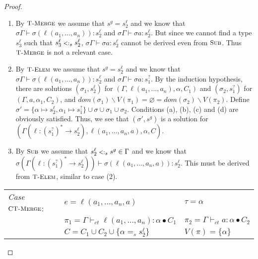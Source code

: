 \documentclass{eptcs}
\newcommand{\ih}{induction hypothesis\xspace}
\newcommand{\CC}{\ensuremath{C}\xspace}
\newcommand{\TElem}{{\small \textsc{T-Elem}}}
\newcommand{\TMerge}{{\small \textsc{T-Merge}}}
\newcommand{\Sub}{{\small \textsc{Sub}}}
\newcommand{\CTMerge}{{\small \textsc{CT-Merge}}}
\newcommand{\sub}{\mathrel{\mbox{{\footnotesize $<:$}}}}
\newcommand{\ctvdash}{\ensuremath{\vdash_{ct}}}
\newcommand{\vsig}[2]{\ensuremath{{#1}^*\rightarrow{#2}}}
\begin{document}
\begin{proof}
\begin{enumerate}
\item By $\TMerge$ we assume that $s^g = s_2^{\ell}$ and we know that
$\sigma\Gamma \vdash \sigma(\ell(a_1,\ldots,a_n)):
s_2^{\ell}$ and $\sigma\Gamma \vdash \sigma a : s_2^{\ell}$. But since we cannot find a
type $s_3^{\ell}$ such that $s_3^{\ell} \sub_s s_2^{\ell}$, $\sigma\Gamma \vdash \sigma a :
s_2^{\ell}$ cannot be derived even from $\Sub$. Thus $\TMerge$ is not a relevant case.

\item By $\TElem$ we assume that $s^g = s_2^{\ell}$ and we know that
$\sigma\Gamma \vdash \sigma(\ell(a_1,\ldots,a_n)):
s_2^{\ell}$ and $\sigma\Gamma \vdash \sigma a : s_1^?$. By the \ih, there are
solutions $(\sigma_1,s_2^{\ell})$ for $(\Gamma, \ell(a_1,\ldots,a_n), \alpha, \CC_1)$
and $(\sigma_2,s_1^?)$ for $(\Gamma,a,\alpha_1,\CC_2)$, and
$dom(\sigma_1) \backslash V(\pi_1) = \varnothing = dom(\sigma_2) \backslash
V(\pi_2)$. Define $\sigma' = \{\alpha \mapsto s_2^{\ell}, \alpha_1 \mapsto s_1^?\}
\cup \sigma \cup \sigma_1 \cup \sigma_2$. Conditions (a), (b), (c) and (d) are obviously satisfied. Thus, we
see that $(\sigma',s^g)$ is a solution for $(\Gamma(\ell :
\vsig{(s_1^?)}{s_2^{\ell}}), \ell(a_1,\ldots,a_n,a), \alpha, \CC)$.

\item By $\Sub$ we assume that $s_2^{\ell} \sub_s s^g \in \Gamma$ and we know that
$\sigma(\Gamma(\ell : \vsig{(s_1^?)}{s_2^{\ell}})) \vdash \sigma(\ell(a_1, \dots, a_n, a))
: s_2^{\ell}$. This must be derived from $\TElem$, similar to case (2). 
\end{enumerate}

\begin{flushleft}
\begin{tabular}{lll}
        \textit{Case} $\CTMerge$:       & $e = \ell(a_1,\ldots,a_n,a)$
                                & $\tau = \alpha$                       \\
                                
                                & $\pi_1 = \Gamma \ctvdash \ell(a_1,\ldots,a_n) : \alpha
                                \bullet \CC_1$                  
                                & $\pi_2 = \Gamma \ctvdash a : \alpha \bullet
                                \CC_2$                                  \\
                                
                                & $\CC = \CC_1 \cup \CC_2 \cup \{\alpha =_s
s_2^{\ell}\}$
                                & $V(\pi) = \{\alpha\}$ \\
                                

\end{tabular}
\end{flushleft}
\end{proof}
\end{document}
